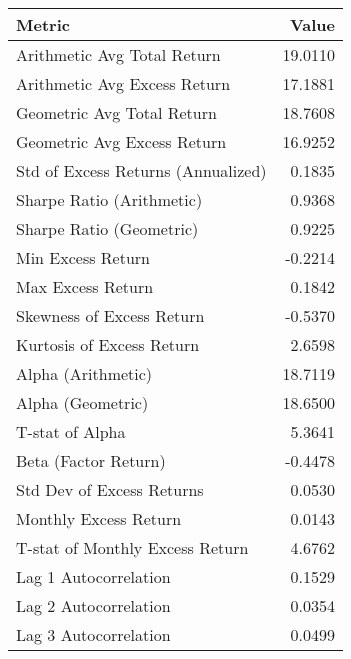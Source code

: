 \begin{tabular}{lr}
\toprule
Metric & Value \\
\midrule
Arithmetic Avg Total Return & 19.0110 \\
Arithmetic Avg Excess Return & 17.1881 \\
Geometric Avg Total Return & 18.7608 \\
Geometric Avg Excess Return & 16.9252 \\
Std of Excess Returns (Annualized) & 0.1835 \\
Sharpe Ratio (Arithmetic) & 0.9368 \\
Sharpe Ratio (Geometric) & 0.9225 \\
Min Excess Return & -0.2214 \\
Max Excess Return & 0.1842 \\
Skewness of Excess Return & -0.5370 \\
Kurtosis of Excess Return & 2.6598 \\
Alpha (Arithmetic) & 18.7119 \\
Alpha (Geometric) & 18.6500 \\
T-stat of Alpha & 5.3641 \\
Beta (Factor Return) & -0.4478 \\
Std Dev of Excess Returns & 0.0530 \\
Monthly Excess Return & 0.0143 \\
T-stat of Monthly Excess Return & 4.6762 \\
Lag 1 Autocorrelation & 0.1529 \\
Lag 2 Autocorrelation & 0.0354 \\
Lag 3 Autocorrelation & 0.0499 \\
\bottomrule
\end{tabular}
